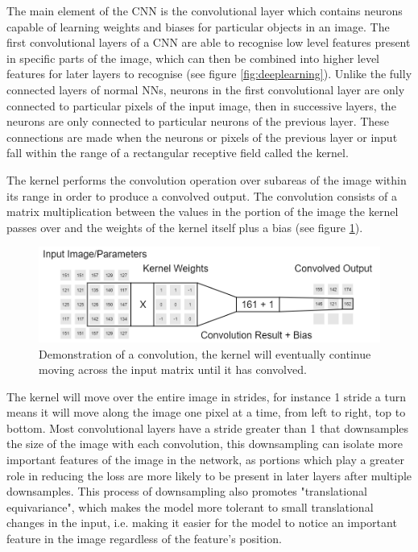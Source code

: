 \documentclass{l4proj}
\begin{document}
The main element of the CNN is the convolutional layer which contains neurons capable of learning weights and biases for particular objects in an image. The first convolutional layers of a CNN are able to recognise low level features present in specific parts of the image, which can then be combined into higher level features for later layers to recognise (see figure \ref{fig:deeplearning}). Unlike the fully connected layers of normal NNs, neurons in the first convolutional layer are only connected to particular pixels of the input image, then in successive layers, the neurons are only connected to particular neurons of the previous layer. These connections are made when the neurons or pixels of the previous layer or input fall within the range of a rectangular receptive field called the kernel. 

The kernel performs the convolution operation over subareas of the image within its range in order to produce a convolved output. The convolution consists of a matrix multiplication between the values in the portion of the image the kernel passes over and the weights of the kernel itself plus a bias (see figure \ref{fig:convolution}).

\begin{figure}[h]
    \centering
    \includegraphics[width=1.0\linewidth]{images/Convolution.png}    

    \caption{Demonstration of a convolution, the kernel will eventually continue moving across the input matrix until it has convolved.}

    \label{fig:convolution} 
\end{figure}

The kernel will move over the entire image in strides, for instance 1 stride a turn means it will move along the image one pixel at a time, from left to right, top to bottom. Most convolutional layers have a stride greater than 1 that downsamples the size of the image with each convolution, this downsampling can isolate more important features of the image in the network, as portions which play a greater role in reducing the loss are more likely to be present in later layers after multiple downsamples. This process of downsampling also promotes "translational equivariance", which makes the model more tolerant to small translational changes in the input, i.e. making it easier for the model to notice an important feature in the image regardless of the feature's position. 
\end{document}

